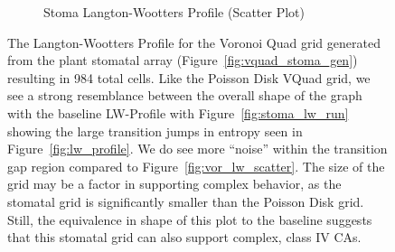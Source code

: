 \documentclass[a4paper,11pt]{report}
\begin{document}
\begin{figure}[htp]
\begin{subfigure}[t]{0.6\textwidth}
  \caption{Stoma Langton-Wootters Profile (Scatter Plot)}
  \label{fig:stoma_lw_scatter}
  \end{subfigure}
\caption[Stoma Langton-Wootters Profile]{
  The Langton-Wootters Profile for the Voronoi Quad grid generated from the plant stomatal array (Figure~\ref{fig:vquad_stoma_gen}) resulting in 984 total cells. Like the Poisson Disk VQuad grid, we see a strong resemblance between the overall shape of the graph with the baseline LW-Profile with Figure~\ref{fig:stoma_lw_run} showing the large transition jumps in entropy seen in Figure~\ref{fig:lw_profile}. We do see more ``noise'' within the transition gap region compared to Figure~\ref{fig:vor_lw_scatter}. The size of the grid may be a factor in supporting complex behavior, as the stomatal grid is significantly smaller than the Poisson Disk grid. Still, the equivalence in shape of this plot to the baseline suggests that this stomatal grid can also support complex, class IV CAs.
}
\label{fig:stoma_lw_profile}
\end{figure}
\end{document}
